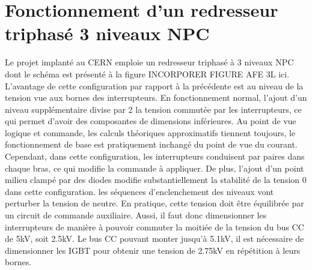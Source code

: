 \section{Fonctionnement d'un redresseur triphasé 3 niveaux NPC}
Le projet implanté au CERN emploie un redresseur triphasé à 3 niveaux NPC dont le schéma est présenté à la figure INCORPORER FIGURE AFE 3L ici. L'avantage de cette configuration par rapport à la précédente est au niveau de la tension vue aux bornes des interrupteurs. En fonctionnement normal, l'ajout d'un niveau supplémentaire divise par 2 la tension commutée par les interrupteurs, ce qui permet d'avoir des composantes de dimensions inférieures. Au point de vue logique et commande, les calculs théoriques approximatifs tiennent toujours, le fonctionnement  de base est pratiquement inchangé du point de vue du courant. Cependant, dans cette configuration, les interrupteurs conduisent par paires dans chaque bras, ce qui modifie la commande à appliquer. De plus, l'ajout d'un point milieu \og clampé \fg{} par des diodes modifie substantiellement la stabilité de la tension 0 dans cette configuration. les séquences d'enclenchement des niveaux vont perturber la tension de neutre. En pratique, cette tension doit être équilibrée par un circuit de commande auxiliaire. Aussi, il faut donc dimensionner les interrupteurs de manière à pouvoir commuter la moitiée de la tension du bus CC de  5kV, soit 2.5kV. Le bus CC pouvant monter jusqu'à 5.1kV, il est nécessaire de dimensionner les IGBT pour obtenir une tension de 2.75kV en répétition à leurs bornes.
